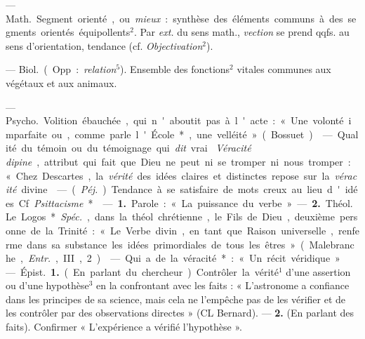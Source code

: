 \begin{itemize}[leftmargin=1cm, label=, itemsep=1pt]
 — \si{Math.} Segment orienté, ou {\it mieux} : synthèse des
éléments communs à des segments orientés équipollents$^2$. Par {\it ext.} du
sens math., {\it vection} se prend qqfs. au sens d’orientation, tendance (cf.
{\it Objectivation}$^2$).

 — \si{Biol.} (Opp. : {\it relation}$^5$). Ensemble des
fonctions$^2$ vitales communes aux végétaux et aux animaux.

 — \si{Psycho.} Volition ébauchée,
qui n'aboutit pas à l'acte : « Une
volonté imparfaite ou, comme parle l'École*, une velléité » (Bossuet).

 — Qualité du témoin ou du témoignage qui {\it dit} vrai. {\it
Véracité dipine}, attribut qui fait que Dieu ne peut ni se tromper ni nous
tromper : « Chez Descartes, la {\it vérité} des idées claires et distinctes
repose sur la {\it véracité} divine.

 — ({\it Péj.}) Tendance à se satisfaire de mots creux au lieu
d'idées. Cf. {\it Psittacisme}*.

 — {\bf 1.} Parole : « La puissance du verbe. » —  {\bf 2.}
\si{Théol.} Le Logos*. {\it Spéc.}, dans la théol. chrétienne, le Fils de
Dieu, deuxième personne de la Trinité : « Le Verbe divin, en tant que Raison
universelle, renferme dans sa substance les idées primordiales de tous les
êtres » (Malebranche, {\it Entr.}, III, 2).

 — Qui a de la véracité* : « Un récit véridique. »

 — \si{Épist.} {\bf 1.} (En parlant du chercheur). Contrôler la
vérité$^1$ d’une assertion ou d’une hypothèse$^3$ en la confrontant avec les
faits : « L’astronome a confiance dans les principes de sa science, mais cela
ne l'empêche pas de les vérifier et de les contrôler par des observations
directes » (CL Bernard). —  {\bf 2.} (En parlant des faits). Confirmer «
L'expérience a vérifié l’hypothèse ».


\end{itemize}
